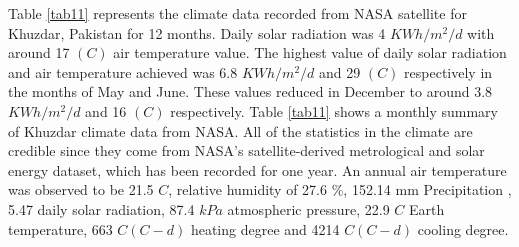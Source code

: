 \documentclass[conference]{IEEEtran}
\begin{document}
Table \ref{tab11} represents the climate data recorded from NASA satellite for Khuzdar, Pakistan for 12 months. Daily solar radiation was 4 $KWh/m^2 / d$ with around 17 $(C)$ air temperature value.  The highest value of daily solar radiation and  air temperature achieved was 6.8 $KWh/m^2 / d$ and 29 $(C)$ respectively in the months of May and June. These values reduced in December to around 3.8  $KWh/m^2 / d$ and 16 $(C)$ respectively.
Table \ref{tab11} shows a monthly summary of Khuzdar climate data from NASA. All of the statistics in the climate are credible since they come from NASA's satellite-derived metrological and solar energy dataset, which has been recorded for one year.
An annual air temperature was observed to be 21.5 $C$, relative humidity of 27.6 $\%$, 152.14 mm Precipitation , 5.47 daily solar radiation, 87.4 $kPa$ atmospheric pressure, 22.9 $C$ Earth temperature, 663 $C (C-d)$ heating degree and 4214 $C (C-d)$ cooling degree.
\end{document}
